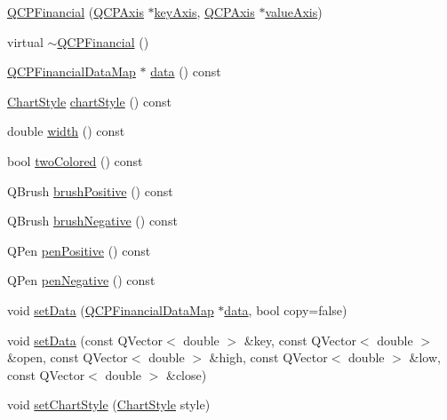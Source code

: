 \begin{DoxyCompactItemize}
\item 
\hyperlink{classQCPFinancial_a4702d5248feeb9d1ec6e3ce725b10b32}{Q\+C\+P\+Financial} (\hyperlink{classQCPAxis}{Q\+C\+P\+Axis} $\ast$\hyperlink{classQCPAbstractPlottable_a72c7a09c22963f2c943f07112b311103}{key\+Axis}, \hyperlink{classQCPAxis}{Q\+C\+P\+Axis} $\ast$\hyperlink{classQCPAbstractPlottable_a3106f9d34d330a6097a8ec5905e5b519}{value\+Axis})
\item 
virtual \hyperlink{classQCPFinancial_ad1fda0d793797b66819fac4682b10f31}{$\sim$\+Q\+C\+P\+Financial} ()
\item 
\hyperlink{qcustomplot_8h_a745c09823fae0974b50beca9bc3b3d7d}{Q\+C\+P\+Financial\+Data\+Map} $\ast$ \hyperlink{classQCPFinancial_a58e05aefa057d16edfcc0334cf81c241}{data} () const 
\item 
\hyperlink{classQCPFinancial_a0f800e21ee98d646dfc6f8f89d10ebfb}{Chart\+Style} \hyperlink{classQCPFinancial_a0888c9308cc5fcb4daa70184f9582412}{chart\+Style} () const 
\item 
double \hyperlink{classQCPFinancial_a71ccaa04cdade0ec08a2117db6e4a4ce}{width} () const 
\item 
bool \hyperlink{classQCPFinancial_a2bab30fc4eee38a0da3a05846b8d7ac7}{two\+Colored} () const 
\item 
Q\+Brush \hyperlink{classQCPFinancial_acb69536a334fae7fc31b2bfd4eca81f5}{brush\+Positive} () const 
\item 
Q\+Brush \hyperlink{classQCPFinancial_a91e09b31ce341c17b917e77fdc68d84e}{brush\+Negative} () const 
\item 
Q\+Pen \hyperlink{classQCPFinancial_a544899bde79d06e17ccefcb9926d87ce}{pen\+Positive} () const 
\item 
Q\+Pen \hyperlink{classQCPFinancial_a557fe911aa04f70c1734c8fa09994148}{pen\+Negative} () const 
\item 
void \hyperlink{classQCPFinancial_adf12a86082f1e488df6a4e8603f8fd6d}{set\+Data} (\hyperlink{qcustomplot_8h_a745c09823fae0974b50beca9bc3b3d7d}{Q\+C\+P\+Financial\+Data\+Map} $\ast$\hyperlink{classQCPFinancial_a58e05aefa057d16edfcc0334cf81c241}{data}, bool copy=false)
\item 
void \hyperlink{classQCPFinancial_a886881339d6447432af55adaad748c3c}{set\+Data} (const Q\+Vector$<$ double $>$ \&key, const Q\+Vector$<$ double $>$ \&open, const Q\+Vector$<$ double $>$ \&high, const Q\+Vector$<$ double $>$ \&low, const Q\+Vector$<$ double $>$ \&close)
\item 
void \hyperlink{classQCPFinancial_a5a59175d36279d71596e64d7bb65596f}{set\+Chart\+Style} (\hyperlink{classQCPFinancial_a0f800e21ee98d646dfc6f8f89d10ebfb}{Chart\+Style} style)

\end{DoxyCompactItemize}
